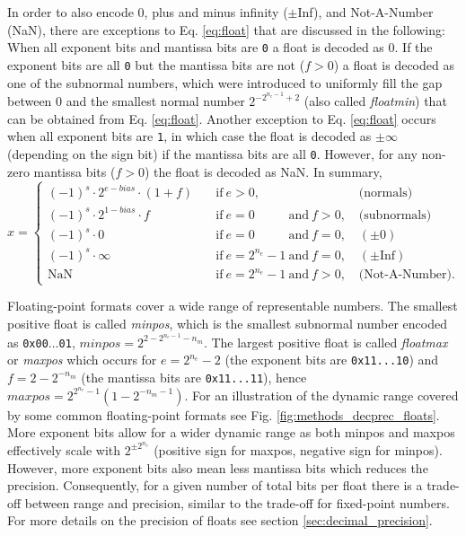 In order to also encode 0, plus and minus infinity ($\pm$Inf), and Not-A-Number (NaN), there are exceptions to Eq. \ref{eq:float} that
are discussed in the following: When all exponent bits and mantissa bits are \texttt{0} a float is decoded as 0. If the exponent bits are
all \texttt{0} but the mantissa bits are not ($f>0$) a float is decoded as one of the subnormal numbers, which were introduced to uniformly
fill the gap between 0 and the smallest normal number $2^{-2^{n_e-1}+2}$ (also called \emph{floatmin}) that can be obtained from
Eq. \ref{eq:float}. Another exception to Eq. \ref{eq:float} occurs when all exponent bits are \texttt{1}, in which case the float is decoded
as $\pm \infty$ (depending on the sign bit) if the mantissa bits are all \texttt{0}. However, for any non-zero mantissa bits ($f>0$) the float is
decoded as NaN. In summary,
\begin{equation}
x = \begin{cases}
(-1)^s \cdot 2^{e-bias} \cdot (1+f) \quad &\text{if}~e > 0,\phantom{^{n_e}-1~\text{and}~f > 0} \quad \text{(normals)} \\
(-1)^s \cdot 2^{1-bias} \cdot f \quad &\text{if}~e=0\phantom{^{n_e}-1}~\text{and}~f > 0, \quad \text{(subnormals)} \\
(-1)^s \cdot 0 \quad &\text{if}~e=0\phantom{^{n_e}-1}~\text{and}~f = 0, \quad (\pm 0) \\
(-1)^s \cdot \infty \quad &\text{if}~e=2^{n_e}-1~\text{and}~f = 0, \quad (\pm \text{Inf}) \\
\text{NaN} \quad &\text{if}~e=2^{n_e}-1~\text{and}~f > 0, \quad \text{(Not-A-Number).}
\end{cases}
\label{eq:float_all}
\end{equation}

Floating-point formats cover a wide range of representable numbers. The smallest positive float is called \emph{minpos}, which is the
smallest subnormal number encoded as \texttt{0x00$\dots$01}, $minpos = 2^{2-2^{n_e - 1}-n_m}$. The largest positive float is called
\emph{floatmax} or \emph{maxpos} which occurs for $e=2^{n_e}-2$ (the exponent bits are \texttt{0x11...10}) and 
$f=2-2^{-n_m}$ (the mantissa bits are \texttt{0x11...11}), hence $maxpos = 2^{2^{n_e}-1}\left(1-2^{-n_m-1}\right)$. For an illustration 
of the dynamic range covered by some common floating-point formats see Fig. \ref{fig:methods_decprec_floats}. More exponent
bits allow for a wider dynamic range as both minpos and maxpos effectively scale with $2^{\pm2^{n_e}}$ (positive sign for maxpos,
negative sign for minpos). However, more exponent bits also mean less mantissa bits which reduces the precision. Consequently,
for a given number of total bits per float there is a trade-off between range and precision, similar to the trade-off for fixed-point numbers.
For more details on the precision of floats see section \ref{sec:decimal_precision}.

